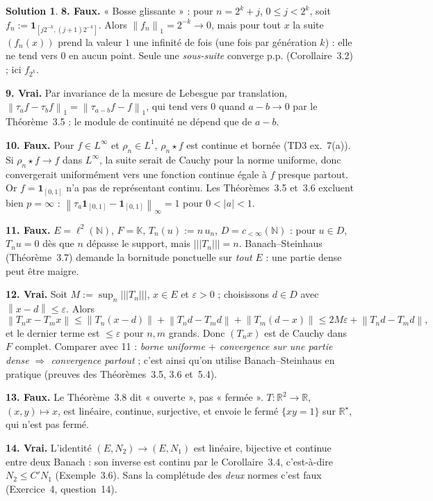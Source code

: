 \documentclass[11pt,a4paper]{article}
\newcommand{\R}{\mathbb{R}}
\newcommand{\N}{\mathbb{N}}
\newcommand{\K}{\mathbb{K}}
\newcommand{\norm}[1]{\left\|#1\right\|}
\newcommand{\opnorm}[1]{|\!|\!|#1|\!|\!|}
\newcommand{\ie}{c'est-à-dire}
\theoremstyle{definition}
\newtheorem*{solution}{Solution}
\begin{document}
\begin{solution}
\medskip
\noindent\textbf{8. Faux.} « Bosse glissante » : pour $n=2^k+j$, $0\le j<2^k$, soit $f_n:=\mathbf 1_{[j2^{-k},(j+1)2^{-k}]}$. Alors $\norm{f_n}_1=2^{-k}\to0$, mais pour tout $x$ la suite $(f_n(x))$ prend la valeur $1$ une infinité de fois (une fois par génération $k$) : elle ne tend vers $0$ en aucun point. Seule une \emph{sous-suite} converge p.p. (Corollaire~3.2) ; ici $f_{2^k}$.

\medskip
\noindent\textbf{9. Vrai.} Par invariance de la mesure de Lebesgue par translation, $\norm{\tau_af-\tau_bf}_1=\norm{\tau_{a-b}f-f}_1$, qui tend vers $0$ quand $a-b\to0$ par le Théorème~3.5 : le module de continuité ne dépend que de $a-b$.

\medskip
\noindent\textbf{10. Faux.} Pour $f\in L^\infty$ et $\rho_n\in L^1$, $\rho_n\star f$ est continue et bornée (TD3 ex.~7(a)). Si $\rho_n\star f\to f$ dans $L^\infty$, la suite serait de Cauchy pour la norme uniforme, donc convergerait uniformément vers une fonction continue égale à $f$ presque partout. Or $f=\mathbf 1_{[0,1]}$ n'a pas de représentant continu. Les Théorèmes~3.5 et~3.6 excluent bien $p=\infty$ : $\norm{\tau_a\mathbf 1_{[0,1]}-\mathbf 1_{[0,1]}}_\infty=1$ pour $0<|a|<1$.

\medskip
\noindent\textbf{11. Faux.} $E=\ell^2(\N)$, $F=\K$, $T_n(u):=n\,u_n$, $D=c_{<\infty}(\N)$ : pour $u\in D$, $T_nu=0$ dès que $n$ dépasse le support, mais $\opnorm{T_n}=n$. Banach--Steinhaus (Théorème~3.7) demande la bornitude ponctuelle sur \emph{tout} $E$ : une partie dense peut être maigre.

\medskip
\noindent\textbf{12. Vrai.} Soit $M:=\sup_n\opnorm{T_n}$, $x\in E$ et $\varepsilon>0$ ; choisissons $d\in D$ avec $\norm{x-d}\le\varepsilon$. Alors
\[
\norm{T_nx-T_mx}\le\norm{T_n(x-d)}+\norm{T_nd-T_md}+\norm{T_m(d-x)}\le2M\varepsilon+\norm{T_nd-T_md},
\]
et le dernier terme est $\le\varepsilon$ pour $n,m$ grands. Donc $(T_nx)$ est de Cauchy dans $F$ complet. Comparer avec 11 : \emph{borne uniforme $+$ convergence sur une partie dense $\Rightarrow$ convergence partout} ; c'est ainsi qu'on utilise Banach--Steinhaus en pratique (preuves des Théorèmes~3.5, 3.6 et~5.4).

\medskip
\noindent\textbf{13. Faux.} Le Théorème~3.8 dit « ouverte », pas « fermée ». $T:\R^2\to\R$, $(x,y)\mapsto x$, est linéaire, continue, surjective, et envoie le fermé $\{xy=1\}$ sur $\R^\star$, qui n'est pas fermé.

\medskip
\noindent\textbf{14. Vrai.} L'identité $(E,N_2)\to(E,N_1)$ est linéaire, bijective et continue entre deux Banach : son inverse est continu par le Corollaire~3.4, \ie{} $N_2\le C'N_1$ (Exemple~3.6). Sans la complétude des \emph{deux} normes c'est faux (Exercice~4, question~14).


\end{solution}
\end{document}
